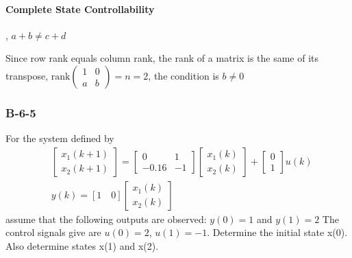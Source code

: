 \paragraph{Complete State Controllability}, $a+b \neq c+d$ \hfill \break 

Since row rank equals column rank, the rank of a matrix is the same of its transpose, $\text{rank}\left(\begin{array}{cc} 1 & 0\\ a & b \end{array}\right) =n =2$, the condition is $b \neq 0$

\subsubsection*{B-6-5}

For the system defined by
\begin{align*}
& \begin{bmatrix}
x_1(k+1) \\
x_2(k+1)
\end{bmatrix}= \begin{bmatrix}
0     &  1  \\
-0.16 & -1
\end{bmatrix}\begin{bmatrix}
x_1(k) \\
x_2(k)
\end{bmatrix}+\begin{bmatrix}
0 \\
1
\end{bmatrix}u(k) \\
& y(k) = [1 \quad 0] \begin{bmatrix}
x_1(k) \\
x_2(k)
\end{bmatrix}
\end{align*}
assume that the following outputs are observed:
$y(0)=1$ and $y(1)=2$
The control signals give are
$u(0)=2$, $u(1)=-1$.
Determine the initial state x(0). Also determine states x(1) and x(2).

